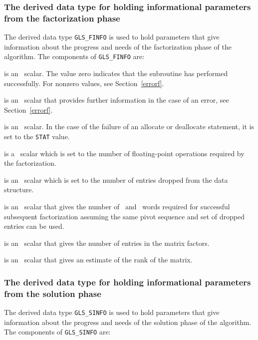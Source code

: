\documentclass{galahad}
\newcommand{\packagename}{GLS}
\begin{document}

\subsubsection{The derived data type for holding informational
 parameters from the factorization phase}\label{typeinformf}
The derived data type
{\tt \packagename\_FINFO}
is used to hold parameters that give information about the progress and needs
of the factorization phase of the algorithm. The components of
{\tt \packagename\_FINFO}
are:

\begin{description}

 is an \integer\ scalar. The value
 zero indicates that the subroutine has performed
 successfully.  For nonzero values, see Section~\ref{errorf}.

 is an \integer\ scalar that provides further information in the
case of an error, see Section~\ref{errorf}.

 is an \integer\ scalar. In the case of the failure of an
allocate or deallocate statement, it is set to the {\tt STAT} value.

 is a \realdp\  scalar which is set to the number of
 floating-point operations required by the factorization.

 is an \integer\ scalar which is set to the number of
entries dropped from the data structure.

 is an \integer\ scalar that gives the number
 of \realdp\  and \integer\ words required for successful
 subsequent factorization assuming the same pivot sequence and set of
 dropped entries can be used.

 is an \integer\ scalar that gives the number of
 entries in the matrix factors.

 is an \integer\ scalar that gives an estimate of the rank of the
matrix.

\end{description}


\subsubsection{The derived data type for holding informational
 parameters from the solution phase}\label{typeinforms}
The derived data type
{\tt \packagename\_SINFO}
is used to hold parameters that give information about the progress and needs
of the solution phase of the algorithm. The components of
{\tt \packagename\_SINFO}
are:
\end{document}
